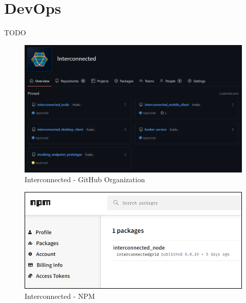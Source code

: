 \section{DevOps}\label{devops}
TODO

\begin{figure}[!ht]
    \centering
    \includegraphics[width=\linewidth]{document/chapters/chapter_7/images/interconnected_organization.png}
    \caption{Interconnected - GitHub Organization}
    \label{fig:interconnected_organization}
\end{figure}

\begin{figure}[!ht]
    \centering
    \includegraphics[scale=0.45]{document/chapters/chapter_7/images/interconnected_npm.png}
    \caption{Interconnected - NPM}
    \label{fig:interconnected_npm}
\end{figure}

